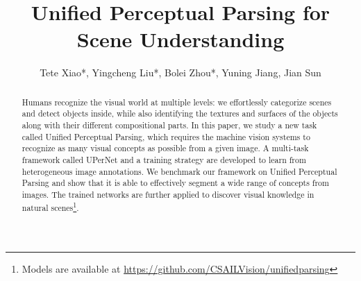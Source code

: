 \documentclass[runningheads]{llncs}
\begin{document}
\newcommand*\rfrac[2]{{}^{#1}\!/_{#2}}
\newcommand{\layername}[1]{{\fontfamily{qcr}\selectfont#1}}
\newcommand{\myparagraph}[1]{{\vspace{0.5em} \noindent \bf #1}}

\pagestyle{headings}
\mainmatter

\def\eg{\emph{e.g.}} \def\Eg{\emph{E.g.}}
\def\ie{\emph{i.e.}} \def\Ie{\emph{I.e}\onedot}
\def\cf{\emph{c.f.}} \def\Cf{\emph{C.f}\onedot}
\def\etc{\emph{etc}.} \def\vs{\emph{vs}\onedot}
\def\wrt{w.r.t.} \def\dof{d.o.f.}
\def\etal{\emph{et al.}}

\title{Unified Perceptual Parsing for Scene Understanding} 






\author{Tete Xiao*, Yingcheng Liu*, Bolei Zhou*, Yuning Jiang, Jian Sun}





\maketitle

\begin{abstract}

Humans recognize the visual world at multiple levels: we effortlessly categorize scenes and detect objects inside, while also identifying the textures and surfaces of the objects along with their different compositional parts. In this paper, we study a new task called Unified Perceptual Parsing, which requires the machine vision systems to recognize as many visual concepts as possible from a given image. A multi-task framework called UPerNet and a training strategy are developed to learn from heterogeneous image annotations. We benchmark our framework on Unified Perceptual Parsing and show that it is able to effectively segment a wide range of concepts from images. The trained networks are further applied to discover visual knowledge in natural scenes\footnote{Models are available at \url{https://github.com/CSAILVision/unifiedparsing}}. 


\end{abstract}
\end{document}
